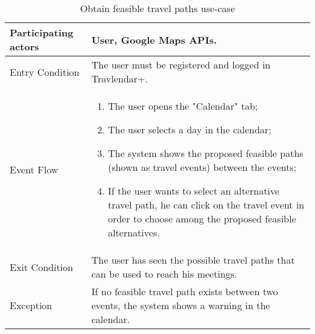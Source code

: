 \begin{table}[H]
	\begin{center}
		\begin{tabular}{ | p{} | p{} | }
		\hline
		Participating actors & User, Google Maps APIs.\\
		\hline
		Entry Condition & The user must be registered and logged in Travlendar+.\\
		\hline
		Event Flow & 
			\begin{enumerate}
				\item The user opens the "Calendar" tab;
				\item The user selects a day in the calendar;
				\item The system shows the proposed feasible paths (shown as travel events) between the events;
				\item If the user wants to select an alternative travel path, he can click on the travel event in order to choose among the proposed feasible alternatives.
			\end{enumerate} \\
		\hline
		Exit Condition & The user has seen the possible travel paths that can be used to reach his meetings.\\
		\hline
		Exception & If no feasible travel path exists between two events, the system shows a warning in the calendar.\\ 
		\hline
		\end{tabular}
	\end{center}
	\caption{Obtain feasible travel paths use-case}
\end{table}